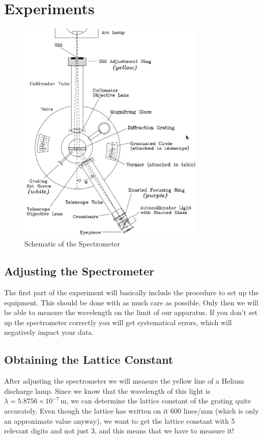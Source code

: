 \section{Experiments}
\begin{figure}[h!]
\centering
\includegraphics[width=0.8\textwidth]{./Exp9/pic/image7.png}
\caption{Schematic of the Spectrometer}
\end{figure}

\subsection{Adjusting the Spectrometer}
The first part of the experiment will basically include the procedure to set up the equipment. This should be done with as much care as possible. Only then we will be able to measure the wavelength on the limit of our apparatus. If you don't set up the spectrometer correctly you will get systematical errors, which will negatively impact your data.

\subsection{Obtaining the Lattice Constant}
 After adjusting the spectrometer we will measure the yellow line of a Helium discharge lamp. Since we know that the wavelength of this light is $\lambda = 5.8756\times 10^{-7}\,\mathrm{m}$, we can determine the lattice constant of the grating quite accurately. Even though the lattice has written on it 600 lines/mm (which is only an approximate value anyway), we want to get the lattice constant with 5 relevant digits and not just 3, and this means that we have to measure it!

